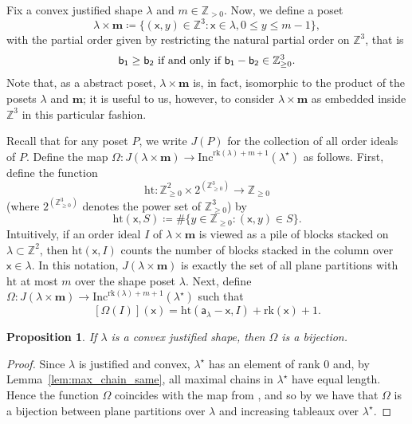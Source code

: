 \documentclass[12pt]{amsart}
\newcommand{\x}{\ensuremath{\mathsf{x}}}
\newcommand{\aaa}{\ensuremath{\mathsf{a}}}
\newtheorem{proposition}[theorem]{Proposition}
\theoremstyle{definition}
\theoremstyle{remark}
\numberwithin{equation}{section}
\newcommand{\inc}{\ensuremath{\mathrm{Inc}}}
\newcommand{\rank}{\ensuremath{\mathrm{rk}}}
\begin{document}
Fix a convex justified shape $\lambda$ and $m \in \mathbb{Z}_{> 0}$. Now, we define a poset
\[
\lambda \times \mathbf{m} \coloneqq \{ (\x, y) \in \mathbb{Z}^3: \x \in \lambda, 0 \leq y \leq  m-1 \},
\] with the partial order given by restricting the natural partial order on $\mathbb{Z}^3$, that is
\[{\sf b_1} \geq {\sf b_2} \text{ if and only if } {\sf b_1}  - {\sf b_2} \in \mathbb{Z}_{\geq 0}^3.\] Note that, as a abstract poset, $\lambda \times \mathbf{m}$ is, in fact, isomorphic to the product of the posets $\lambda$ and $\mathbf{m}$; it is useful to us, however, to consider $\lambda \times \mathbf{m}$ as embedded inside $\mathbb{Z}^3$ in this particular fashion.


Recall that for any poset $P$, we write $J(P)$ for the collection of all order ideals of $P$.  
 Define the map $\Omega : J(\lambda \times \mathbf{m}) \rightarrow \inc^{\rank(\lambda)+ m+1}(\lambda^\star)$ as follows. 
 First, define the function 
 \[
 \mathrm{ht}: \mathbb{Z}_{\geq 0}^2 \times 2^{(\mathbb{Z}_{\geq 0}^3)} \rightarrow \mathbb{Z}_{\geq 0}
 \] (where $2^{(\mathbb{Z}_{\geq 0}^3)}$ denotes the power set of $\mathbb{Z}_{\geq 0}^3$) by 
 \[ \mathrm{ht}(\x,S) \coloneqq  \# \{ y \in \mathbb{Z}_{\geq 0} : (\x,y) \in S \}.  \]  
Intuitively, if an order ideal $I$ of $\lambda \times \mathbf{m}$ is viewed as a pile of blocks stacked on $\lambda \subset \mathbb{Z}^2$, then $\mathrm{ht}(\x,I)$ counts the number of blocks stacked in the column over $\x \in \lambda$. In this notation, $J(\lambda \times \mathbf{m})$ is exactly the set of all plane partitions with $\mathrm{ht}$ at most $m$ over the shape poset $\lambda$. Next, define $\Omega: J(\lambda \times \mathbf{m}) \rightarrow \inc^{\rank(\lambda) + m + 1}(\lambda^{\star})$ such that 
\[ [\Omega(I)]( \x )= \mathrm{ht}(\aaa_\lambda - \x,I) + \rank(\x)+1.\] 

\begin{proposition}\label{prop:bijection}
If $\lambda$ is a convex justified shape, then  $\Omega$ is a bijection.
\end{proposition}
\begin{proof}
Since $\lambda$ is justified and convex, $\lambda^\star$ has an element of rank $0$ and, by Lemma~\ref{lem:max_chain_same}, all maximal chains in $\lambda^\star$ have equal length. Hence the function $\Omega$ coincides with the map from \cite[Proposition~8.2]{HPPW}, and so by \cite[Proposition~8.2]{HPPW} we have that $\Omega$ is a bijection between plane partitions over $\lambda$ and increasing tableaux over $\lambda^\star$.
\end{proof}
\end{document}
